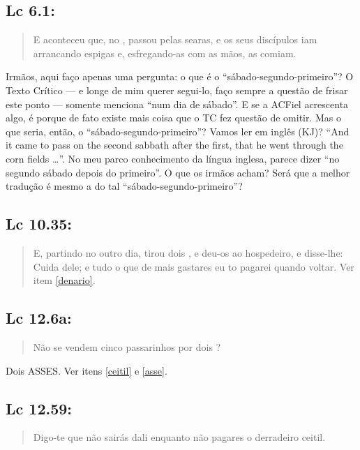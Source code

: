 \subsection{Lc 6.1:}
\begin{quote}
    \small
E aconteceu que, no ,
passou pelas searas, e os seus discípulos iam arrancando espigas e,
esfregando-as com as mãos, as comiam.
\end{quote}

Irmãos, aqui faço apenas uma pergunta: o que é o ``sá\-ba\-do-se\-gun\-do-pri\-mei\-ro''? O Texto Crítico --- e longe de mim querer segui-lo, faço sempre a questão de frisar este ponto --- somente menciona ``num dia de sábado''. E se a ACFiel acrescenta algo, é porque de fato existe mais coisa que o TC fez questão de omitir. Mas o que seria, então, o ``sábado-segundo-primeiro''? Vamos ler em inglês
(KJ)? ``And it came to pass on the second sabbath after the first, that he went through the corn fields \ldots''. No meu parco conhecimento da língua inglesa, parece dizer ``no segundo sábado depois do primeiro''. O que os irmãos acham? Será que a melhor tradução é mesmo a do tal ``sábado-segundo-primeiro''?

\subsection{Lc 10.35:}
\begin{quote}
    \small
E, partindo no outro dia, tirou dois , e deu-os ao hospedeiro, e disse-lhe: Cuida dele; e tudo o que de mais gastares eu to pagarei quando voltar.
Ver item \ref{denario}.
    \end{quote}

\subsection{Lc 12.6a:}
\begin{quote}
    \small
Não se vendem cinco passarinhos por dois ?
\end{quote}

Dois ASSES. Ver itens \ref{ceitil} e \ref{asse}.

\subsection{Lc 12.59:}
\begin{quote}
    \small
Digo-te que não sairás dali enquanto não pagares o derradeiro ceitil.
\end{quote}

